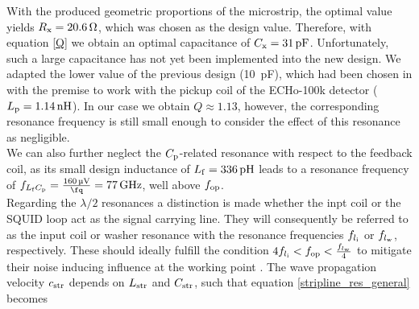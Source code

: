 With the produced geometric proportions of the microstrip, the optimal value yields $R_{\rm x}=\qty{20.6}{\ohm}$, which was chosen as the design value. Therefore, with equation \ref{Q} we obtain an optimal capacitance of $C_{\rm x}=\qty{31}{\pF}$. Unfortunately, such a large capacitance has not yet been implemented into the new design. We adapted the lower value of the previous design (\qty{10}{\pF}), which had been chosen in \cite{Bauer2022} with the premise to work with the pickup coil of the ECHo-100k detector ($L_{\rm p}=\qty{1.14}{\nH}$). In our case we obtain $Q\approx 1.13$, however, the corresponding resonance frequency is still small enough to consider the effect of this resonance as negligible. \\
We can also further neglect the $C_{\rm p}$-related resonance with respect to the feedback coil, as its small design inductance of $L_{\rm f}=\qty{336}{\pH}$ leads to a resonance frequency of $f_{L_{\rm f}C_{\rm p}}=\frac{\qty{160}{\uV}}{\unit{\fq}}=\qty{77}{\GHz}$, well above $f_{\rm op}$. 
\\

Regarding the $\lambda/2$ resonances a distinction is made whether the inpt coil or the SQUID loop act as the signal carrying line. They will consequently be referred to as the input coil or washer resonance with the resonance frequencies $f_{l_{\rm i}}$ or $f_{l_{\rm w}}$, respectively. These should ideally fulfill the condition $4f_{l_{\rm i}}<f_{\rm op}<\frac{f_{l_{\rm w}}}{4}$ to mitigate their noise inducing influence at the working point \cite{Can1991}. The wave propagation velocity $c_{\rm str}$ depends on $L_{\rm str}$ and $C_{\rm str}$, such that equation \ref{stripline_res_general} becomes \cite{EnpukuIII1992}        


